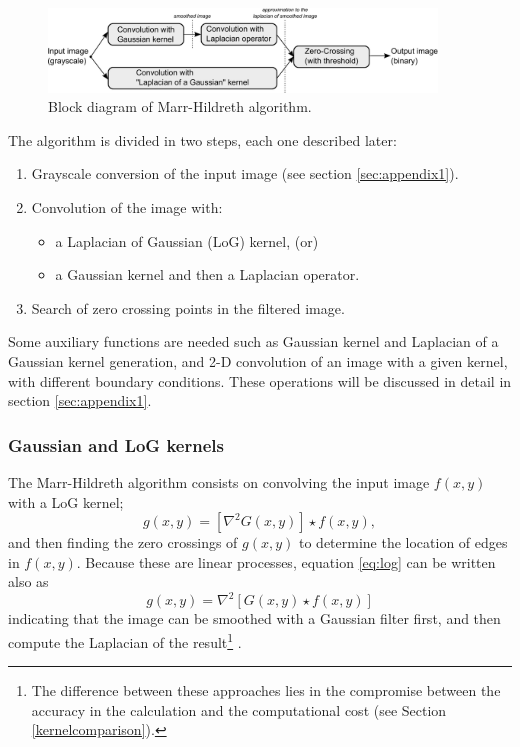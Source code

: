 \documentclass{ipol}
\numberwithin{equation}{section}
\numberwithin{table}{section}
\begin{document}
{\begin{figure}[!b]
	\centering
	\includegraphics[width=0.92\textwidth]{blockdiagram2.pdf}
	\caption{Block diagram of Marr-Hildreth algorithm.}
	\label{fig:blockdiagram2}
\end{figure}

The algorithm is divided in two steps, each one described later:
\begin{enumerate}
	\item Grayscale conversion of the input image (see section \ref{sec:appendix1}).
	\item Convolution of the image with:
	\begin{itemize}
		\item a Laplacian of Gaussian (LoG) kernel, (or)
		\item a Gaussian kernel and then a Laplacian operator.
	\end{itemize}
	\item Search of zero crossing points in the filtered image.
\end{enumerate}

Some auxiliary functions are needed such as Gaussian kernel and Laplacian of a Gaussian 
kernel generation, and 2-D convolution of an image with a given kernel, 
with different boundary conditions. These operations will be discussed 
in detail in section \ref{sec:appendix1}.


\subsubsection{Gaussian and LoG kernels}

The Marr-Hildreth algorithm consists on convolving the input image $f(x,y)$ with a LoG kernel;
\begin{equation}\label{eq:log}
  g(x,y) = [\nabla^2G(x,y)]\star f(x,y), 
\end{equation}
and then finding the zero crossings of $g(x,y)$ to determine the location of edges in $f(x,y)$. 
Because these are linear processes, equation \ref{eq:log} can be written also as
\begin{equation}
  g(x,y) = \nabla^2[G(x,y)\star f(x,y)]
\end{equation}
indicating that the image can be smoothed with a Gaussian filter first, and then compute the Laplacian of the result\footnote{The difference between these approaches lies in the compromise between the accuracy in the calculation and the computational cost (see Section \ref{kernelcomparison}).} .

}
\end{document}
